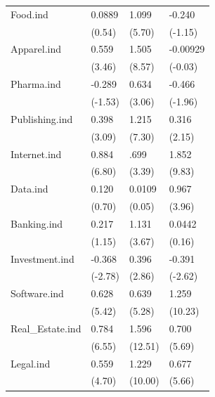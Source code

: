 \begin{longtable}{p{3 cm} p{2.25 cm} p{2.25 cm} p{2.25 cm}}
Food.ind &      0.0889         &       1.099\sym{***}&      -0.240         \\
            &      (0.54)         &      (5.70)         &     (-1.15)         \\
Apparel.ind &       0.559\sym{***}&       1.505\sym{***}&    -0.00929         \\
            &      (3.46)         &      (8.57)         &     (-0.03)         \\
Pharma.ind &      -0.289         &       0.634\sym{**} &      -0.466\sym{*}  \\
            &     (-1.53)         &      (3.06)         &     (-1.96)         \\
Publishing.ind &       0.398\sym{**} &       1.215\sym{***}&       0.316\sym{*}  \\
            &      (3.09)         &      (7.30)         &      (2.15)         \\
Internet.ind &       0.884\sym{***}&       .699\sym{***}&       1.852\sym{***}\\
            &      (6.80)         &      (3.39)         &      (9.83)         \\
Data.ind &       0.120         &   0.0109     &       0.967\sym{***}       \\
            &      (0.70)         &      (0.05)         &        (3.96)       \\
Banking.ind &       0.217         &       1.131\sym{***}&      0.0442         \\
            &      (1.15)         &      (3.67)         &      (0.16)         \\
Investment.ind &      -0.368\sym{**} &       0.396\sym{**} &      -0.391\sym{**} \\
            &     (-2.78)         &      (2.86)         &     (-2.62)         \\
Software.ind &       0.628\sym{***}&      0.639\sym{***} &       1.259\sym{***}\\
            &      (5.42)         &     (5.28)         &             (10.23)  \\
Real\_Estate.ind &       0.784\sym{***}&       1.596\sym{***}&       0.700\sym{***}\\
            &      (6.55)         &     (12.51)         &      (5.69)         \\
Legal.ind &       0.559\sym{***}&       1.229\sym{***}&       0.677\sym{***}\\
            &      (4.70)         &     (10.00)         &      (5.66)         \\


\end{longtable}
